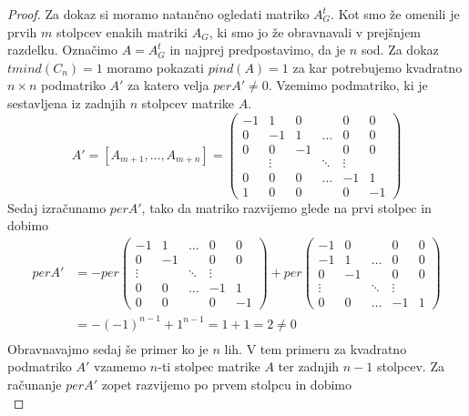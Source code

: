 \documentclass[12pt,a4paper,twoside]{article}
\theoremstyle{definition} %
\theoremstyle{plain} %
\numberwithin{equation}{section}  %
\begin{document}
\begin{proof}
Za dokaz si moramo natančno ogledati matriko $A_G^t$. Kot smo že omenili je prvih $m$ stolpcev enakih matriki $A_G$, ki smo jo že obravnavali v prejšnjem razdelku. Označimo $A =  A_G^t$ in najprej predpostavimo, da je $n$ sod. Za dokaz $tmind(C_n) = 1$ moramo pokazati $pind(A) = 1$ za kar potrebujemo kvadratno $n \times n$ podmatriko $A'$ za katero velja $perA' \neq 0$. Vzemimo podmatriko, ki je sestavljena iz zadnjih $n$ stolpcev matrike $A$.
$$ 
A' =[A_{m+1}, \ldots, A_{m+n}] = 
\left( 
\begin{matrix} -1 & 1 & 0 &  & 0 & 0 \\ 0 & -1 & 1 & \ldots & 0 & 0 \\
0 & 0 & -1 &  & 0 & 0 \\ 
 & \vdots &  & \ddots & \vdots &  \\ 
0 & 0 & 0 & \ldots & -1 & 1 \\
 1 & 0 & 0 &  & 0 & -1 
\end{matrix} \right)
$$
Sedaj izračunamo $perA'$, tako da matriko razvijemo glede na prvi stolpec in dobimo
\begin{equation*}
\begin{split}
 perA' &=-per\left( 
\begin{matrix} 
 -1 & 1 & \ldots & 0 & 0 \\ 
 0 & -1 &  & 0 & 0 \\ 
 \vdots &  & \ddots & \vdots &  \\ 
 0 & 0 & \ldots & -1 & 1 \\
 0 & 0 &  & 0 & -1 
\end{matrix} \right) 
+per\left( 
\begin{matrix} 
- 1 & 0 &  & 0 & 0 \\
 -1 & 1 & \ldots & 0 & 0 \\  0 & -1 &  & 0 & 0 \\ 
  \vdots &  & \ddots & \vdots &  \\ 
 0 & 0 & \ldots & -1 & 1 
\end{matrix} \right) \\
&=-(-1)^{n-1} + 1^{n-1} =  1 + 1 = 2 \neq 0\\
\end{split}
\end{equation*}
Obravnavajmo sedaj še primer ko je $n$ lih. V tem primeru za kvadratno podmatriko $A'$ vzamemo $n$-ti stolpec matrike $A$ ter zadnjih $n-1$ stolpcev. Za računanje $perA'$ zopet razvijemo po prvem stolpcu in dobimo
\begin{equation*}

\end{equation*}
\end{proof}
\end{document}
